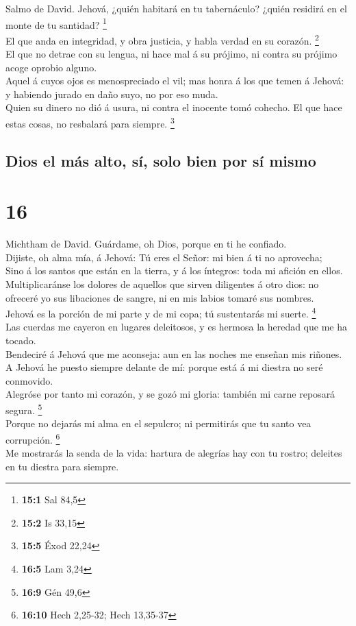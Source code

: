  Salmo de David. Jehová, ¿quién habitará en tu tabernáculo?
¿quién residirá en el monte de tu santidad? \footnote{\textbf{15:1} Sal
  84,5}\\
 El que anda en integridad, y obra justicia, y habla verdad
en su corazón. \footnote{\textbf{15:2} Is 33,15}\\
 El que no detrae con su lengua, ni hace mal á su prójimo,
ni contra su prójimo acoge oprobio alguno.\\
 Aquel á cuyos ojos es menospreciado el vil; mas honra á los
que temen á Jehová: y habiendo jurado en daño suyo, no por eso muda.\\
 Quien su dinero no dió á usura, ni contra el inocente tomó
cohecho. El que hace estas cosas, no resbalará para siempre. \footnote{\textbf{15:5}
  Éxod 22,24}

\hypertarget{dios-el-muxe1s-alto-suxed-solo-bien-por-suxed-mismo}{%
\subsection{Dios el más alto, sí, solo bien por sí
mismo}\label{dios-el-muxe1s-alto-suxed-solo-bien-por-suxed-mismo}}

\hypertarget{section-15}{%
\section{16}\label{section-15}}

 Michtham de David. Guárdame, oh Dios, porque en ti he
confiado.\\
 Dijiste, oh alma mía, á Jehová: Tú eres el Señor: mi bien á
ti no aprovecha;\\
 Sino á los santos que están en la tierra, y á los íntegros:
toda mi afición en ellos.\\
 Multiplicaránse los dolores de aquellos que sirven
diligentes á otro dios: no ofreceré yo sus libaciones de sangre, ni en
mis labios tomaré sus nombres.\\
 Jehová es la porción de mi parte y de mi copa; tú
sustentarás mi suerte. \footnote{\textbf{16:5} Lam 3,24}\\
 Las cuerdas me cayeron en lugares deleitosos, y es hermosa
la heredad que me ha tocado.\\
 Bendeciré á Jehová que me aconseja: aun en las noches me
enseñan mis riñones.\\
 A Jehová he puesto siempre delante de mí: porque está á mi
diestra no seré conmovido.\\
 Alegróse por tanto mi corazón, y se gozó mi gloria: también
mi carne reposará segura. \footnote{\textbf{16:9} Gén 49,6}\\
 Porque no dejarás mi alma en el sepulcro; ni permitirás
que tu santo vea corrupción. \footnote{\textbf{16:10} Hech 2,25-32; Hech
  13,35-37}\\
 Me mostrarás la senda de la vida: hartura de alegrías hay
con tu rostro; deleites en tu diestra para siempre.


